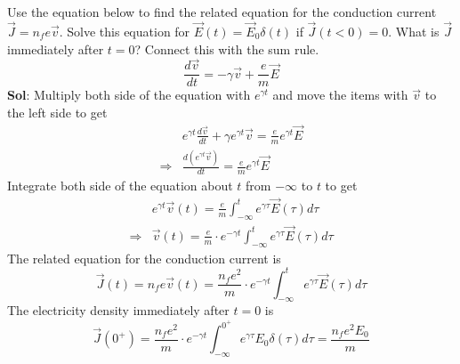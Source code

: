 \documentclass[10pt,a4paper]{article}
\begin{document}
\section{}
Use the equation below to find the related equation for the conduction current $\vec{J}=n_fe\vec{v}$. Solve this equation for $\vec{E}(t)=\vec{E}_0\delta(t)$ if $\vec{J}(t<0)=0$. What is $\vec{J}$ immediately after $t=0$? Connect this with the sum rule.
\[
\frac{d\vec{v}}{dt}=-\gamma\vec{v}+\frac{e}{m}\vec{E}
\]
\textbf{Sol}: Multiply both side of the equation with $e^{\gamma t}$ and move the items with $\vec{v}$ to the left side to get
\begin{align*}
&e^{\gamma t}\frac{d\vec{v}}{dt}+\gamma e^{\gamma t}\vec{v}=\frac{e}{m}e^{\gamma t}\vec{E}\\
\Longrightarrow&\frac{d(e^{\gamma t}\vec{v})}{dt}=\frac{e}{m}e^{\gamma t}\vec{E}
\end{align*}
Integrate both side of the equation about $t$ from $-\infty$ to $t$ to get
\begin{align*}
&e^{\gamma t}\vec{v}(t)=\frac{e}{m}\int_{-\infty}^{t}e^{\gamma\tau}\vec{E}(\tau)d\tau\\
\Longrightarrow&\vec{v}(t)=\frac{e}{m}\cdot e^{-\gamma t}\int_{-\infty}^{t}e^{\gamma\tau}\vec{E}(\tau)d\tau
\end{align*}
The related equation for the conduction current is
\[
\vec{J}(t)=n_fe\vec{v}(t)=\frac{n_fe^2}{m}\cdot e^{-\gamma t}\int_{-\infty}^{t}e^{\gamma\tau}\vec{E}(\tau)d\tau
\]
The electricity density immediately after $t=0$ is
\[
\vec{J}(0^+)=\frac{n_fe^2}{m}\cdot e^{-\gamma t}\int_{-\infty}^{0^+}e^{\gamma\tau}E_0\delta(\tau)d\tau=\frac{n_fe^2E_0}{m}
\]
\end{document}
